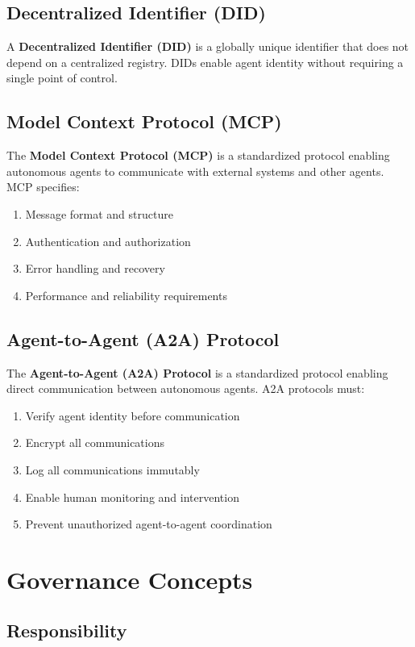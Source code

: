\documentclass[12pt,a4paper,twoside,openright]{book}
\begin{document}
\subsection{Decentralized Identifier (DID)}

A \textbf{Decentralized Identifier (DID)} is a globally unique identifier that does not depend on a centralized registry. DIDs enable agent identity without requiring a single point of control.

\subsection{Model Context Protocol (MCP)}

The \textbf{Model Context Protocol (MCP)} is a standardized protocol enabling autonomous agents to communicate with external systems and other agents. MCP specifies:
\begin{enumerate}
    \item Message format and structure
    \item Authentication and authorization
    \item Error handling and recovery
    \item Performance and reliability requirements
\end{enumerate}

\subsection{Agent-to-Agent (A2A) Protocol}

The \textbf{Agent-to-Agent (A2A) Protocol} is a standardized protocol enabling direct communication between autonomous agents. A2A protocols must:
\begin{enumerate}
    \item Verify agent identity before communication
    \item Encrypt all communications
    \item Log all communications immutably
    \item Enable human monitoring and intervention
    \item Prevent unauthorized agent-to-agent coordination
\end{enumerate}

\section{Governance Concepts}

\subsection{Responsibility}
\end{document}
